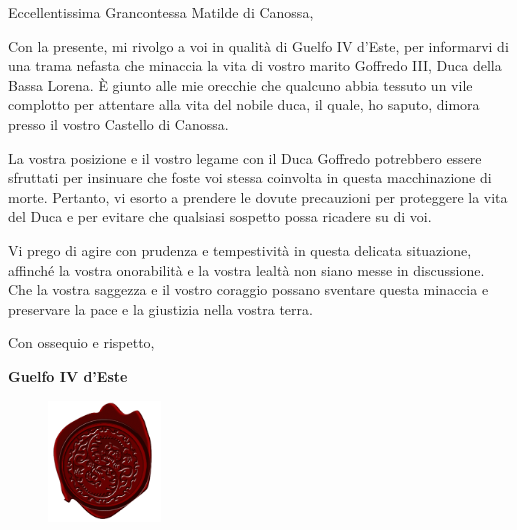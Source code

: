 \documentclass[a4,openany,nodeprecatedcode]{dndbook}
\begin{document}
\vspace*{5cm}
\Fontlukas
Eccellentissima Grancontessa Matilde di Canossa,

Con la presente, mi rivolgo a voi in qualità di Guelfo IV d'Este, per informarvi di una trama nefasta che minaccia la vita di vostro marito Goffredo III, Duca della Bassa Lorena. È giunto alle mie orecchie che qualcuno abbia tessuto un vile complotto per attentare alla vita del nobile duca, il quale, ho saputo, dimora presso il vostro Castello di Canossa.

La vostra posizione e il vostro legame con il Duca Goffredo potrebbero essere sfruttati per insinuare che foste voi stessa coinvolta in questa macchinazione di morte. Pertanto, vi esorto a prendere le dovute precauzioni per proteggere la vita del Duca e per evitare che qualsiasi sospetto possa ricadere su di voi.

Vi prego di agire con prudenza e tempestività in questa delicata situazione, affinché la vostra onorabilità e la vostra lealtà non siano messe in discussione. Che la vostra saggezza e il vostro coraggio possano sventare questa minaccia e preservare la pace e la giustizia nella vostra terra.

Con ossequio e rispetto,

\hspace*{10cm}\huge\textbf{Guelfo IV d'Este}
\begin{figure}
\includegraphics[width=3cm]{img/sigillo.png}
\end{figure}
\end{document}
